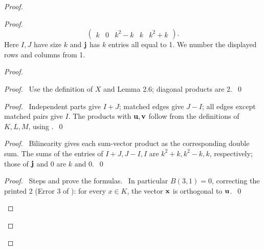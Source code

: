 \begin{proof}
\begin{proof}
{\[\begin{pmatrix}
  k&0&k^2-k&k&k^2+k
  \end{pmatrix}.
  \]
  Here $I,J$ have size $k$ and ${\mathbf j}$ has $k$ entries all equal to 1.
  We number the displayed rows and columns from 1.}
 \begin{proof}
  \begin{proof}\pf\ Use the definition of $X$ and Lemma 2.6; diagonal products are 2.~\qed\end{proof}
  \begin{proof}
   \pf\ Independent parts give $I+J$; matched edges give $J-I$;
   all edges except matched pairs give $I$. The products with ${\mathbf u},{\mathbf v}$ follow from
   the definitions of $K,L,M$, using .~\qed
  \end{proof}
  \begin{proof}
   \pf\ Bilinearity gives each sum-vector product as the corresponding double sum.
   The sums of the entries of $I+J,J-I,I$ are $k^2+k,k^2-k,k$, respectively;
   those of ${\mathbf j}$ and 0 are $k$ and 0.~\qed
  \end{proof}
  \qedstep
  \begin{proof}
   \pf\ Steps  and  prove the formulas.
   \repair\ In particular $B(3,1)=0$, correcting the printed 2 (Error 3 of
   ): for every $x\in K$, the vector ${\mathbf x}$ is orthogonal to ${\mathbf u}$.~\qed
  \end{proof}
 \end{proof}


\end{proof}
\end{proof}
